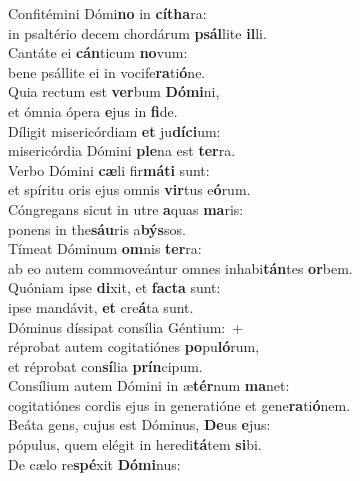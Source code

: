 \evenverse Confitémini Dómi\textbf{no} in \textbf{cí}\textbf{tha}ra:~\*\\
\evenverse in psaltério decem chordárum \textbf{psál}lite \textbf{il}li.\\
\oddverse Cantáte ei \textbf{cán}ticum \textbf{no}vum:~\*\\
\oddverse bene psállite ei in vocife\textbf{ra}ti\textbf{ó}ne.\\
\evenverse Quia rectum est \textbf{ver}bum \textbf{Dó}\textbf{mi}ni,~\*\\
\evenverse et ómnia ópera \textbf{e}jus in \textbf{fi}de.\\
\oddverse Díligit misericórdiam \textbf{et} ju\textbf{dí}\textbf{ci}um:~\*\\
\oddverse misericórdia Dómini \textbf{ple}na est \textbf{ter}ra.\\
\evenverse Verbo Dómini \textbf{cæ}li fir\textbf{má}\textbf{ti} sunt:~\*\\
\evenverse et spíritu oris ejus omnis \textbf{vir}tus e\textbf{ó}rum.\\
\oddverse Cóngregans sicut in utre \textbf{a}quas \textbf{ma}ris:~\*\\
\oddverse ponens in the\textbf{sáu}ris a\textbf{býs}sos.\\
\evenverse Tímeat Dóminum \textbf{om}nis \textbf{ter}ra:~\*\\
\evenverse ab eo autem commoveántur omnes inhabi\textbf{tán}tes \textbf{or}bem.\\
\oddverse Quóniam ipse \textbf{di}xit, et \textbf{fa}\textbf{cta} sunt:~\*\\
\oddverse ipse mandávit, \textbf{et} cre\textbf{á}ta sunt.\\
\evenverse Dóminus díssipat consília Géntium:~+\\
\evenverse  réprobat autem cogitatiónes \textbf{po}pu\textbf{ló}rum,~\*\\
\evenverse et réprobat con\textbf{sí}lia \textbf{prín}cipum.\\
\oddverse Consílium autem Dómini in æ\textbf{tér}num \textbf{ma}net:~\*\\
\oddverse cogitatiónes cordis ejus in generatióne et gene\textbf{ra}ti\textbf{ó}nem.\\
\evenverse Beáta gens, cujus est Dóminus, \textbf{De}us \textbf{e}jus:~\*\\
\evenverse pópulus, quem elégit in heredi\textbf{tá}tem \textbf{si}bi.\\
\oddverse De cælo re\textbf{spé}xit \textbf{Dó}\textbf{mi}nus:~\*\\
